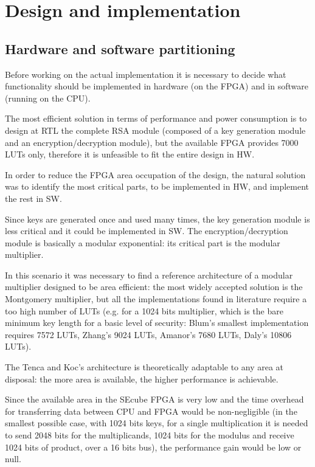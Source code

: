 \chapter{Design and implementation}
\section{Hardware and software partitioning}
Before working on the actual implementation it is necessary to decide what
functionality should be implemented in hardware (on the FPGA) and in software
(running on the CPU).

The most efficient solution in terms of performance and power consumption is to
design at RTL the complete RSA module (composed of a key generation module and
an encryption/decryption module), but the available FPGA provides 7000 LUTs
only, therefore it is unfeasible to fit the entire design in HW.

In order to reduce the FPGA area occupation of the design, the natural solution
was to identify the most critical parts, to be implemented in HW, and implement
the rest in SW.

Since keys are generated once and used many times, the key generation module is
less critical and it could be implemented in SW.  The encryption/decryption
module is basically a modular exponential: its critical part is the modular
multiplier.

In this scenario it was necessary to find a reference architecture of a modular
multiplier designed to be area efficient: the most widely accepted solution is
the Montgomery multiplier, but all the implementations found in literature
require a too high number of LUTs (e.g. for a 1024 bits multiplier, which is
the bare minimum key length for a basic level of security: Blum's \cite{blum}
smallest implementation requires 7572 LUTs, Zhang's \cite{ZHANG2007456} 9024
LUTs, Amanor's \cite{amanor} 7680 LUTs, Daly's
\cite{Daly02efficientarchitectures} 10806 LUTs).

The Tenca and Koc's \cite{tenca_koc} architecture is theoretically adaptable to
any area at disposal: the more area is available, the higher performance is
achievable.

Since the available area in the SEcube FPGA is very low and the time overhead
for transferring data between CPU and FPGA would be non-negligible (in the
smallest possible case, with 1024 bits keys, for a single multiplication it is
needed to send 2048 bits for the multiplicands, 1024 bits for the modulus and
receive 1024 bits of product, over a 16 bits bus), the performance gain would
be low or null.

